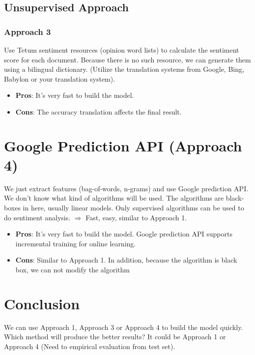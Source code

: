 \documentclass[runningheads,a4paper]{article}
\begin{document}
\subsection{Unsupervised Approach}
\subsubsection{Approach 3} Use Tetum sentiment resources (opinion word lists) to calculate the sentiment score for each document. Because there is no such resource, we can generate them using a bilingual dictionary. (Utilize the translation systems from Google, Bing, Babylon or your translation system).
	\begin{itemize}
		\item \textbf{Pros}: It's very fast to build the model.
		\item \textbf{Cons}: The accuracy translation affects the final result.
	\end{itemize}

\section{Google Prediction API (Approach 4)}
We just extract features (bag-of-words, n-grams) and use Google prediction API. We don't know what kind of algorithms will be used. The algorithms are black-boxes in  here, usually linear models. Only supervised algorithms can be used to do sentiment analysis.
$\Rightarrow$ Fast, easy, similar to Approach 1.
	\begin{itemize}
		\item \textbf{Pros}: It's very fast to build the model. Google prediction API supports incremental training for online learning.
		\item \textbf{Cons}: Similar to Approach 1. In addition, because the algorithm is black box, we can not modify the algorithm
	\end{itemize}
\section{Conclusion}
We can use Approach 1, Approach 3 or Approach 4 to build the model quickly. Which method will produce the better results? It could be Approach 1 or Approach 4 (Need to empirical evaluation from test set).

{}


\end{document}
